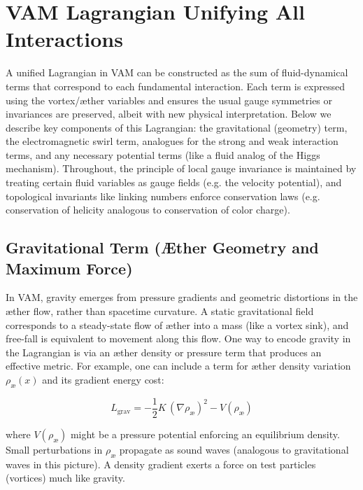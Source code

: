 \documentclass[a4paper,12pt]{article}
\begin{document}
        
        \section{VAM Lagrangian Unifying All Interactions}
        
        A unified Lagrangian in VAM can be constructed as the sum of fluid-dynamical terms that correspond to each fundamental interaction. Each term is expressed using the vortex/æther variables and ensures the usual gauge symmetries or invariances are preserved, albeit with new physical interpretation. Below we describe key components of this Lagrangian: the gravitational (geometry) term, the electromagnetic swirl term, analogues for the strong and weak interaction terms, and any necessary potential terms (like a fluid analog of the Higgs mechanism). Throughout, the principle of local gauge invariance is maintained by treating certain fluid variables as gauge fields (e.g. the velocity potential), and topological invariants like linking numbers enforce conservation laws (e.g. conservation of helicity analogous to conservation of color charge).
        
        \subsection{Gravitational Term (Æther Geometry and Maximum Force)}
        
        In VAM, gravity emerges from pressure gradients and geometric distortions in the æther flow, rather than spacetime curvature. A static gravitational field corresponds to a steady-state flow of æther into a mass (like a vortex sink), and free-fall is equivalent to movement along this flow. One way to encode gravity in the Lagrangian is via an æther density or pressure term that produces an effective metric. For example, one can include a term for æther density variation $\rho_{\text{\ae}}(x)$ and its gradient energy cost:
        
        \begin{equation}
            L_{\text{grav}} = -\frac{1}{2}K\,(\nabla \rho_{\text{\ae}})^2 - V(\rho_{\text{\ae}})
            \label{eq:grav-lagrangian}
        \end{equation}
    
        where $V(\rho_{\text{\ae}})$ might be a pressure potential enforcing an equilibrium density. Small perturbations in $\rho_{\text{\ae}}$ propagate as sound waves (analogous to gravitational waves in this picture). A density gradient exerts a force on test particles (vortices) much like gravity.
        
\end{document}
